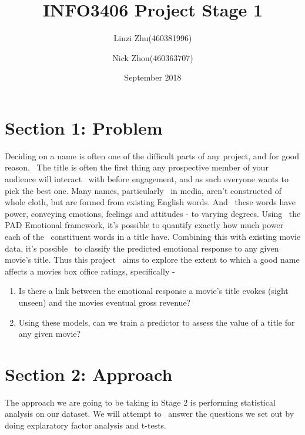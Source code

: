 \documentclass[10pt,a4paper]{article}
\begin{document}
\begin{titlepage}
    \title{INFO3406 Project Stage 1}
    \author{Linzi Zhu(460381996)\\
            \and
            Nick Zhou(460363707)
    }
    \date{September 2018}
    \maketitle
\end{titlepage}
    \begin{tableofcontents}
        \centering
        \tableofcontents
    \end{tableofcontents}
    \pagebreak

    \section{Section 1: Problem}
    Deciding on a name is often one of the difficult parts of any project, and for good reason. \
    The title is often the first thing any prospective member of your audience will interact \
    with before engagement, and as such everyone wants to pick the best one. Many names, particularly \
    in media, aren't constructed of whole cloth, but are formed from existing English words. And \
    these words have power, conveying emotions, feelings and attitudes - to varying degrees. Using \
    the PAD Emotional framework, it's possible to quantify exactly how much power each of the \
    constituent words in a title have. Combining this with existing movie data, it's possible \
    to classify the predicted emotional response to any given movie's title. Thus this project \
    aims to explore the extent to which a good name affects a movies box office ratings, specifically -

    \begin{enumerate}
        \item Is there a link between the emotional response a movie's title evokes (sight unseen) and the movies eventual gross revenue?
        \item Using these models, can we train a predictor to assess the value of a title for any given movie?

    \end{enumerate}

    \section{Section 2: Approach}
    The approach we are going to be taking in Stage 2 is performing statistical analysis on our dataset. We will attempt to \
    answer the questions we set out by doing explaratory factor analysis and t-tests.
\end{document}
